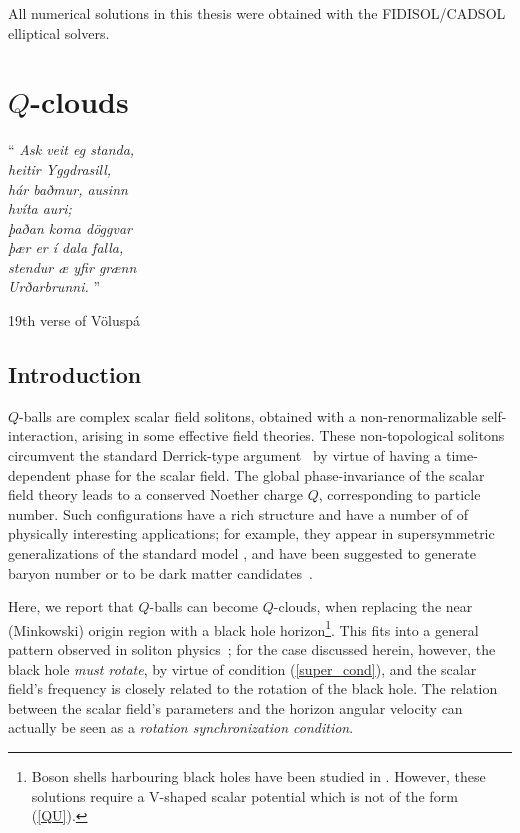 All numerical solutions in this thesis were obtained with the FIDISOL/CADSOL elliptical solvers\cite{schoen}.
\chapter{$Q$-clouds}
\label{ch:Q}

\epigraph{``\emph{
Ask veit eg standa, \\
heitir Yggdrasill, \\
hár baðmur, ausinn \\
hvíta auri; \\
þaðan koma döggvar \\
þær er í dala falla, \\
stendur æ yfir grænn \\
Urðarbrunni. 
} 
''}{19th verse of Völuspá}
\section{Introduction}

$Q$-balls are complex scalar field solitons, obtained with a non-renormalizable self-interaction, arising in some effective field theories. 
These non-topological solitons circumvent the standard Derrick-type argument~\cite{Derrick:1964ww} by virtue of having a
time-dependent phase for the scalar field.
The global phase-invariance of the scalar field theory leads to a conserved Noether
charge $Q$, corresponding to particle number.
Such configurations have a rich structure and
have a number of
of physically interesting applications;
for example, they appear in supersymmetric generalizations of the standard model \cite{Kusenko:1997zq}, 
and have been suggested to generate baryon number or to be dark matter candidates~\cite{Kusenko:1997si}.

\bigskip

Here, we report that $Q$-balls can become $Q$-clouds, when replacing the near (Minkowski) origin region with a black hole horizon\footnote{
Boson shells harbouring black holes have been studied in \cite{Kleihaus:2010ep}.
However, these solutions require a V-shaped scalar potential which
is not of the form (\ref{QU}).}.
This fits into a general pattern observed in soliton physics~\cite{Bizon:1994dh,Volkov:1998cc,Herdeiro:2014ima}; for the case discussed herein, however, the black hole \textit{must rotate}, by virtue of condition (\ref{super_cond}), and the scalar field's frequency is closely related to the rotation of the black hole.
The relation between the scalar field's parameters and the horizon angular velocity can actually be seen as a \textit {rotation synchronization condition}.
%
%
